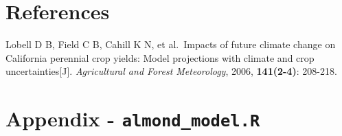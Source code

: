 \documentclass[
]{article}
\begin{document}
\hypertarget{references}{%
\section{References}\label{references}}

Lobell D B, Field C B, Cahill K N, et al.~Impacts of future climate
change on California perennial crop yields: Model projections with
climate and crop uncertainties{[}J{]}. \emph{Agricultural and Forest
Meteorology}, 2006, \textbf{141(2-4)}: 208-218.

\hypertarget{appendix---almond_model.r}{%
\section{\texorpdfstring{Appendix -
\texttt{almond\_model.R}}{Appendix - almond\_model.R}}\label{appendix---almond_model.r}}
\end{document}
